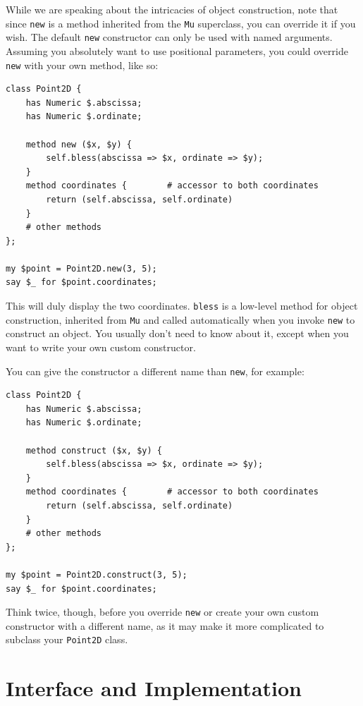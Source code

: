 While we are speaking about the intricacies of object 
construction, note that since {\tt new} is a method inherited 
from the {\tt Mu} superclass, you can override it if you wish. 
The default {\tt new} constructor can only be used with named 
arguments. Assuming you absolutely want to use positional parameters, you 
could override {\tt new} with your own method, like so:
 

\begin{verbatim}
class Point2D {
    has Numeric $.abscissa;
    has Numeric $.ordinate;

    method new ($x, $y) {
        self.bless(abscissa => $x, ordinate => $y);
    }
    method coordinates {        # accessor to both coordinates
        return (self.abscissa, self.ordinate)
    }
    # other methods
};

my $point = Point2D.new(3, 5);
say $_ for $point.coordinates;
\end{verbatim}

This will duly display the two coordinates. {\tt bless} is a 
low-level method for object construction, inherited from 
{\tt Mu} and called automatically when you invoke 
{\tt new} to construct an object. You usually don't need 
to know about it, except when you want to write your own custom 
constructor.

You can give the constructor a different name than {\tt new}, 
for example:

\begin{verbatim}
class Point2D {
    has Numeric $.abscissa;
    has Numeric $.ordinate;

    method construct ($x, $y) {
        self.bless(abscissa => $x, ordinate => $y);
    }
    method coordinates {        # accessor to both coordinates
        return (self.abscissa, self.ordinate)
    }
    # other methods
};

my $point = Point2D.construct(3, 5);
say $_ for $point.coordinates;
\end{verbatim}

Think twice, though, before you override {\tt new} or create your 
own custom constructor with a different name, as it may make it 
more complicated to subclass your {\tt Point2D} class.



\section{Interface and Implementation}

